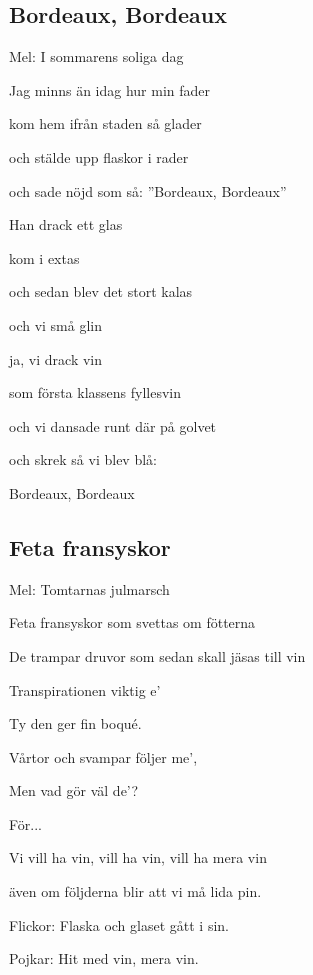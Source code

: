 

\pagestyle{Vinvisor}



\subsection{\textbf{Bordeaux, Bordeaux}}

Mel: I sommarens soliga dag\bigskip

Jag minns än idag hur min fader

kom hem ifrån staden så glader

och stälde upp flaskor i rader

och sade nöjd som så: ”Bordeaux, Bordeaux”\bigskip

Han drack ett glas

kom i extas

och sedan blev det stort kalas

och vi små glin

ja, vi drack vin

som första klassens fyllesvin

och vi dansade runt där på golvet

och skrek så vi blev blå:

Bordeaux, Bordeaux

\subsection{\textbf{Feta fransyskor}}

Mel: Tomtarnas julmarsch \bigskip


Feta fransyskor som svettas om fötterna

De trampar druvor som sedan skall jäsas till vin

Transpirationen viktig e’

Ty den ger fin boqué.

Vårtor och svampar följer me’,

Men vad gör väl de’?\bigskip

För...

Vi vill ha vin, vill ha vin, vill ha mera vin

även om följderna blir att vi må lida pin.

Flickor: Flaska och glaset gått i sin.

Pojkar: Hit med vin, mera vin.


